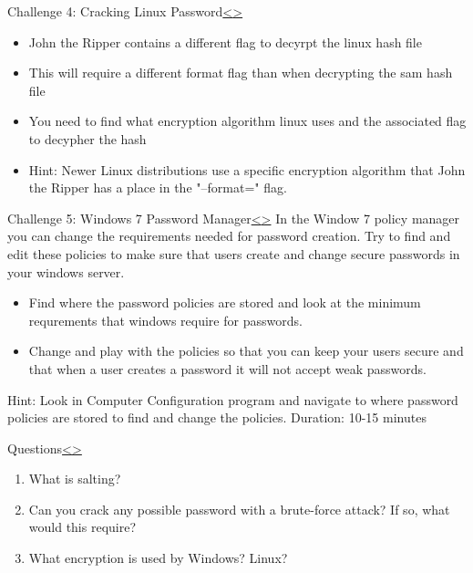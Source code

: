 \documentclass[12pt]{article}
\newenvironment{instructionblock}{\Large\bgroup}{\egroup}
\newcommand{\bi}{\begin{itemize}}
\newcommand{\ei}{\end{itemize}}
\begin{document}
\pagebreak
\begin{slide}{Challenge 4: Cracking Linux Password}{\hyperref[slide 19]{\textless}\hyperref[slide 21]{\textgreater}}
	\begin{instructionblock}
		\bi
			\item John the Ripper contains a different flag to decyrpt the linux hash file
            \item This will require a different format flag than when decrypting the sam hash file
			\item You need to find what encryption algorithm linux uses and the associated flag to decypher the hash
		\ei
	\end{instructionblock}
\end{slide}
	\bi
		\item Hint: Newer Linux distributions use a specific encryption algorithm that John the Ripper has a place in the "--format=" flag.
	\ei
\vfill
	\cite{book}
\pagebreak
\begin{slide}{Challenge 5: Windows 7 Password Manager}{\hyperref[slide 20]{\textless}\hyperref[slide 22]{\textgreater}}
	\begin{instructionblock}
		In the Window 7 policy manager you can change the requirements needed for password creation. Try to find and edit these policies to make sure that users create and change secure passwords in your windows server.
		\bi
			\item Find where the password policies are stored and look at the minimum requrements that windows require for passwords.
			\item Change and play with the policies so that you can keep your users secure and that when a user creates a password it will not accept weak passwords.
		\ei
	\end{instructionblock}
\end{slide}
Hint: Look in Computer Configuration program and navigate to where password policies are stored to find and change the policies.
\vfill
Duration: 10-15 minutes

\pagebreak
\begin{slide}{Questions}{\hyperref[slide 21]{\textless}\hyperref[slide 23]{\textgreater}}
	\vskip 10pt
	\begin{instructionblock}
		\begin{enumerate}
			\item What is salting?
			\item Can you crack any possible password with a brute-force attack? If so, what would this require?
			\item What encryption is used by Windows? Linux?
		\end{enumerate}
	\end{instructionblock}
\end{slide}
\end{document}
